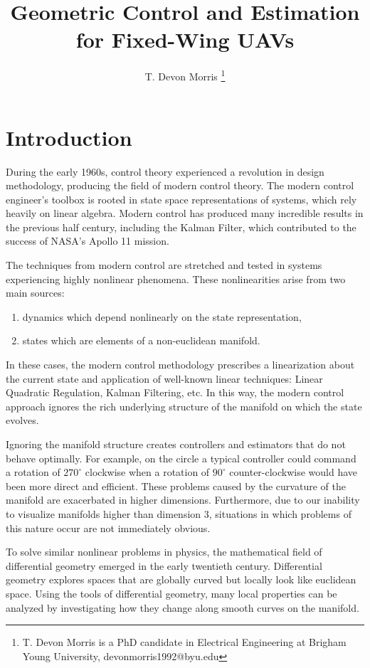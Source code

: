 \documentclass[letterpaper, 10 pt, conference]{ieeeconf}  %
\title{Geometric Control and Estimation for Fixed-Wing UAVs}
\author{T. Devon Morris%
    \thanks{T. Devon Morris is a PhD candidate in Electrical Engineering at Brigham Young University, devonmorris1992@byu.edu}}
\begin{document}
\maketitle 
\section{Introduction}
During the early 1960s, control theory experienced a revolution in design methodology, producing the field of modern control theory. The modern control engineer's toolbox is rooted in state space representations of systems, which rely heavily on linear algebra. Modern control has produced many incredible results in the previous half century, including the Kalman Filter, which contributed to the success of NASA's Apollo 11 mission.

The techniques from modern control are stretched and tested in systems experiencing highly nonlinear phenomena. These nonlinearities arise from two main sources:
\begin{enumerate}
  \item dynamics which depend nonlinearly on the state representation,
  \item states which are elements of a non-euclidean manifold.
\end{enumerate}
In these cases, the modern control methodology prescribes a linearization about the current state and application of well-known linear techniques: Linear Quadratic Regulation, Kalman Filtering, etc. In this way, the modern control approach ignores the rich underlying structure of the manifold on which the state evolves.

Ignoring the manifold structure creates controllers and estimators that do not behave optimally. For example, on the circle a typical controller could command a rotation of $270^{\circ}$ clockwise when a rotation of $90^{\circ}$ counter-clockwise would have been more direct and efficient. These problems caused by the curvature of the manifold are exacerbated in higher dimensions. Furthermore, due to our inability to visualize manifolds higher than dimension 3, situations in which problems of this nature occur are not immediately obvious.

To solve similar nonlinear problems in physics, the mathematical field of differential geometry emerged in the early twentieth century. Differential geometry explores spaces that are globally curved but locally look like euclidean space. Using the tools of differential geometry, many local properties can be analyzed by investigating how they change along smooth curves on the manifold. 
  
\end{document}
